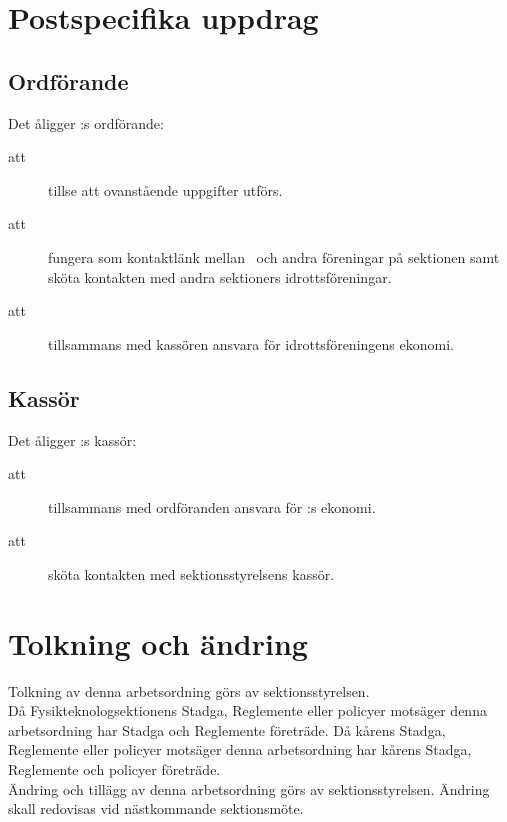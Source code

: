 \section{Postspecifika uppdrag}

\subsection{Ordförande}
Det åligger \forening:s ordförande:
    \begin{description}
      \item[att] tillse att ovanstående uppgifter utförs.
      \item[att] fungera som kontaktlänk mellan \forening \ och andra
      föreningar på sektionen samt sköta kontakten med andra
      sektioners idrotts\-före\-ning\-ar.
      \item[att] tillsammans med kassören ansvara för idrottsföreningens ekonomi.
    \end{description}

\subsection{Kassör}
Det åligger \forening:s kassör:
    \begin{description}
      \item[att] tillsammans med ordföranden ansvara för \forening:s ekonomi.
      \item[att] sköta kontakten med sektionsstyrelsens kassör.
    \end{description}


\section{Tolkning och ändring}
Tolkning av denna arbetsordning görs av sektionsstyrelsen.\\ Då Fysikteknologsektionens Stadga, Reglemente eller policyer motsäger denna arbetsordning har Stadga och Reglemente företräde. Då kårens Stadga, Reglemente eller policyer motsäger denna arbetsordning har kårens Stadga, Reglemente och policyer företräde.\\
Ändring och tillägg av denna arbetsordning görs av sektionsstyrelsen. Ändring skall redovisas vid nästkommande sektionsmöte. 

\newpage